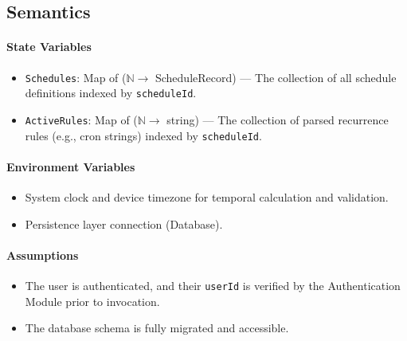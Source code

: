 \begin{center}
\end{center}


\subsection{Semantics}

\paragraph{State Variables}
\begin{itemize}
    \item \texttt{Schedules}: Map of ($\mathbb{N} \rightarrow$ ScheduleRecord) --- The collection of all schedule definitions indexed by \texttt{scheduleId}.
    \item \texttt{ActiveRules}: Map of ($\mathbb{N} \rightarrow$ string) --- The collection of parsed recurrence rules (e.g., cron strings) indexed by \texttt{scheduleId}.
\end{itemize}

\paragraph{Environment Variables}
\begin{itemize}
    \item System clock and device timezone for temporal calculation and validation.
    \item Persistence layer connection (Database).
\end{itemize}

\paragraph{Assumptions}
\begin{itemize}
    \item The user is authenticated, and their \texttt{userId} is verified by the Authentication Module prior to invocation.
    \item The database schema is fully migrated and accessible.
\end{itemize}

